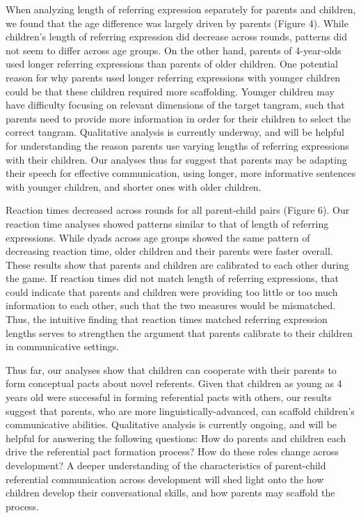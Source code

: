\documentclass[10pt, letterpaper]{article}
\begin{document}
When analyzing length of referring expression separately for parents and
children, we found that the age difference was largely driven by parents
(Figure 4). While children's length of referring expression did decrease
across rounds, patterns did not seem to differ across age groups. On the
other hand, parents of 4-year-olds used longer referring expressions
than parents of older children. One potential reason for why parents
used longer referring expressions with younger children could be that
these children required more scaffolding. Younger children may have
difficulty focusing on relevant dimensions of the target tangram, such
that parents need to provide more information in order for their
children to select the correct tangram. Qualitative analysis is
currently underway, and will be helpful for understanding the reason
parents use varying lengths of referring expressions with their
children. Our analyses thus far suggest that parents may be adapting
their speech for effective communication, using longer, more informative
sentences with younger children, and shorter ones with older children.

Reaction times decreased across rounds for all parent-child pairs
(Figure 6). Our reaction time analyses showed patterns similar to that
of length of referring expressions. While dyads across age groups showed
the same pattern of decreasing reaction time, older children and their
parents were faster overall. These results show that parents and
children are calibrated to each other during the game. If reaction times
did not match length of referring expressions, that could indicate that
parents and children were providing too little or too much information
to each other, such that the two measures would be mismatched. Thus, the
intuitive finding that reaction times matched referring expression
lengths serves to strengthen the argument that parents calibrate to
their children in communicative settings.

Thus far, our analyses show that children can cooperate with their
parents to form conceptual pacts about novel referents. Given that
children as young as 4 years old were successful in forming referential
pacts with others, our results suggest that parents, who are more
linguistically-advanced, can scaffold children's communicative
abilities. Qualitative analysis is currently ongoing, and will be
helpful for answering the following questions: How do parents and
children each drive the referential pact formation process? How do these
roles change across development? A deeper understanding of the
characteristics of parent-child referential communication across
development will shed light onto the how children develop their
conversational skills, and how parents may scaffold the process.
\end{document}
